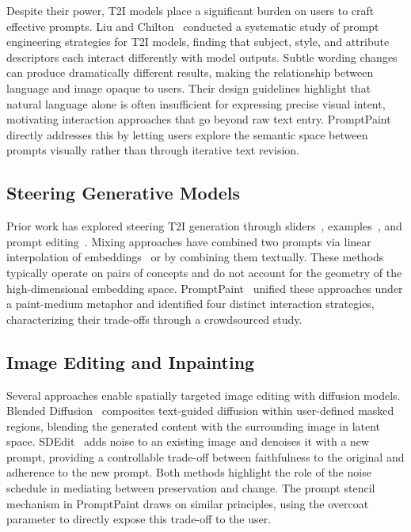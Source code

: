 \documentclass[sigconf]{acmart}
\begin{document}
Despite their power, T2I models place a significant burden on users to craft
effective prompts. Liu and Chilton~\cite{liu2022promptengineering} conducted a
systematic study of prompt engineering strategies for T2I models, finding that
subject, style, and attribute descriptors each interact differently with model
outputs. Subtle wording changes can produce dramatically different results,
making the relationship between language and image opaque to users.
Their design guidelines highlight that natural language alone is often
insufficient for expressing precise visual intent, motivating interaction
approaches that go beyond raw text entry. PromptPaint directly addresses
this by letting users explore the semantic space between prompts visually
rather than through iterative text revision.

\subsection{Steering Generative Models}

Prior work has explored steering T2I generation through sliders~\cite{gandissect},
examples~\cite{gal2022image}, and prompt editing~\cite{brooks2023instructpix2pix}.
Mixing approaches have combined two prompts via linear interpolation of
embeddings~\cite{liu2022compositional} or by combining them textually.
These methods typically operate on pairs of concepts and do not account for
the geometry of the high-dimensional embedding space.
PromptPaint~\cite{chung2023promptpaint} unified these approaches under a
paint-medium metaphor and identified four distinct interaction strategies,
characterizing their trade-offs through a crowdsourced study.

\subsection{Image Editing and Inpainting}

Several approaches enable spatially targeted image editing with diffusion models.
Blended Diffusion~\cite{avrahami2022blended} composites text-guided diffusion
within user-defined masked regions, blending the generated content with the
surrounding image in latent space. SDEdit~\cite{meng2021sdedit} adds noise to
an existing image and denoises it with a new prompt, providing a controllable
trade-off between faithfulness to the original and adherence to the new
prompt. Both methods highlight the role of the noise schedule in mediating
between preservation and change. The prompt stencil mechanism in PromptPaint
draws on similar principles, using the overcoat parameter to directly expose
this trade-off to the user.
\end{document}
